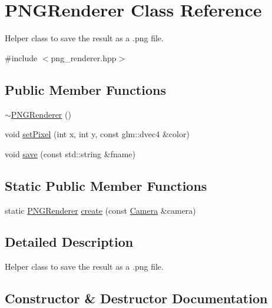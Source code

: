 \hypertarget{class_p_n_g_renderer}{}\section{P\+N\+G\+Renderer Class Reference}
\label{class_p_n_g_renderer}


Helper class to save the result as a {\itshape }.png file.  




{\ttfamily \#include $<$png\+\_\+renderer.\+hpp$>$}

\subsection*{Public Member Functions}
\begin{DoxyCompactItemize}
\item 
\hyperlink{class_p_n_g_renderer_a6fced206ff06a257b0968721fe6874d5}{$\sim$\+P\+N\+G\+Renderer} ()
\item 
void \hyperlink{class_p_n_g_renderer_a764cd27eb8412d1746d94b5a4decc6da}{set\+Pixel} (int x, int y, const glm\+::dvec4 \&color)
\item 
void \hyperlink{class_p_n_g_renderer_acee8c4150a67f128719bf830c853335d}{save} (const std\+::string \&fname)
\end{DoxyCompactItemize}
\subsection*{Static Public Member Functions}
\begin{DoxyCompactItemize}
\item 
static \hyperlink{class_p_n_g_renderer}{P\+N\+G\+Renderer} \hyperlink{class_p_n_g_renderer_acfc2e3bfdf62063f0a9f0fb22b76fe15}{create} (const \hyperlink{class_camera}{Camera} \&camera)
\end{DoxyCompactItemize}


\subsection{Detailed Description}
Helper class to save the result as a {\itshape }.png file. 

\subsection{Constructor \& Destructor Documentation}
